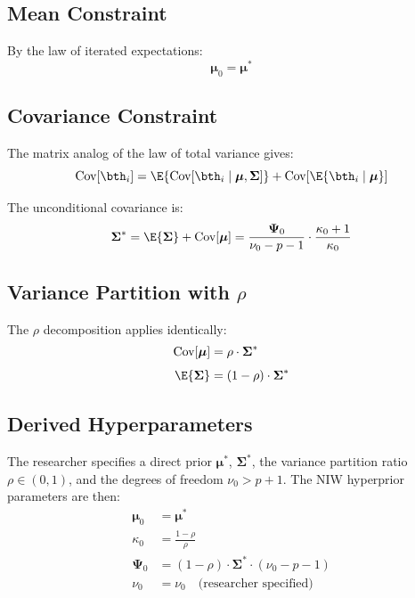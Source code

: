 \subsection{Mean Constraint}

By the law of iterated expectations:
\begin{equation}
  \label{eq:niw_mean_constraint}
  \boldsymbol{\mu}_0 = \boldsymbol{\mu}^*
\end{equation}

\subsection{Covariance Constraint}

The matrix analog of the law of total variance gives:
\begin{equation}
  \label{eq:matrix_total_var}
  \text{Cov}[\bth_i]
    = \E{\text{Cov}[\bth_i \mid \boldsymbol{\mu}, \boldsymbol{\Sigma}]}
    + \text{Cov}[\E{\bth_i \mid \boldsymbol{\mu}}]
\end{equation}

The unconditional covariance is:
\begin{equation}
  \label{eq:niw_total_cov}
  \boldsymbol{\Sigma}^*
    = \E{\boldsymbol{\Sigma}} + \text{Cov}[\boldsymbol{\mu}]
    = \frac{\boldsymbol{\Psi}_0}{\nu_0 - p - 1}
      \cdot \frac{\kappa_0 + 1}{\kappa_0}
\end{equation}

\subsection{Variance Partition with \texorpdfstring{$\rho$}{rho}}

The $\rho$ decomposition applies identically:
\begin{align}
  \label{eq:niw_cov_mu}
  \text{Cov}[\boldsymbol{\mu}]
    &= \rho \cdot \boldsymbol{\Sigma}^* \\[4pt]
  \label{eq:niw_E_sigma}
  \E{\boldsymbol{\Sigma}}
    &= (1 - \rho) \cdot \boldsymbol{\Sigma}^*
\end{align}

\subsection{Derived Hyperparameters}

The researcher specifies a direct prior $\boldsymbol{\mu}^*$,
$\boldsymbol{\Sigma}^*$, the variance partition ratio $\rho \in (0, 1)$, and
the degrees of freedom $\nu_0 > p + 1$. The NIW hyperprior parameters are then:
\begin{align}
  \boldsymbol{\mu}_0 &= \boldsymbol{\mu}^*
    \label{eq:niw_hp_mu} \\[3pt]
  \kappa_0 &= \frac{1 - \rho}{\rho}
    \label{eq:niw_hp_kappa} \\[3pt]
  \boldsymbol{\Psi}_0 &= (1-\rho) \cdot \boldsymbol{\Sigma}^* \cdot (\nu_0 - p - 1)
    \label{eq:niw_hp_psi} \\[3pt]
  \nu_0 &= \nu_0 \quad \text{(researcher specified)}
    \label{eq:niw_hp_nu}
\end{align}

